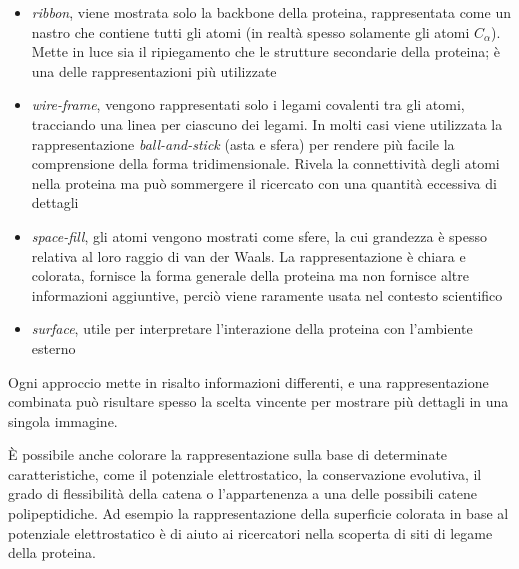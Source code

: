 \begin{itemize}
	\item \textit{ribbon}, viene mostrata solo la backbone della proteina, rappresentata come un nastro che contiene tutti gli atomi (in realtà spesso solamente gli atomi $C_{\alpha}$). Mette in luce sia il ripiegamento che le strutture secondarie della proteina; è una delle rappresentazioni più utilizzate\\
	
	\item \textit{wire-frame}, vengono rappresentati solo i legami covalenti tra gli atomi, tracciando una linea per ciascuno dei legami. In molti casi viene utilizzata la rappresentazione \textit{ball-and-stick} (asta e sfera) per rendere più facile la comprensione della forma tridimensionale. Rivela la connettività degli atomi nella proteina ma può sommergere il ricercato con una quantità eccessiva di dettagli\\

	\item \textit{space-fill}, gli atomi vengono mostrati come sfere, la cui grandezza è spesso relativa al loro raggio di van der Waals. La rappresentazione è chiara e colorata, fornisce la forma generale della proteina ma non fornisce altre informazioni aggiuntive, perciò viene raramente usata nel contesto scientifico\\

	\item \textit{surface}, utile per interpretare l'interazione della proteina con l'ambiente esterno
\end{itemize}

Ogni approccio mette in risalto informazioni differenti, e una rappresentazione combinata può risultare spesso la scelta vincente per mostrare più dettagli in una singola immagine.

\par È possibile anche colorare la rappresentazione sulla base di determinate caratteristiche, come il potenziale elettrostatico, la conservazione evolutiva, il grado di flessibilità della catena o l'appartenenza a una delle possibili catene polipeptidiche. Ad esempio la rappresentazione della superficie colorata in base al potenziale elettrostatico è di aiuto ai ricercatori nella scoperta di siti di legame della proteina.

